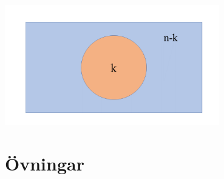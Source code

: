 \documentclass{tufte-handout}
\begin{document}
\begin{center}
    \includegraphics[width=0.7\textwidth]{graphics/komplementbild2.png}
 \end{center}



\section{Övningar}
\end{document}
